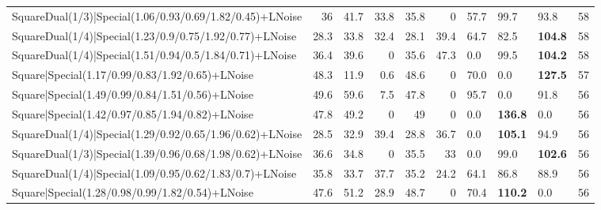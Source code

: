 \begin{tabular}{lrrrrrlllr}
 SquareDual(1/3)|Special(1.06/0.93/0.69/1.82/0.45)+LNoise        &            36   &            41.7 &            33.8 &            35.8 &            0   & 57.7            & 99.7           & 93.8           &           58 \\
 SquareDual(1/4)|Special(1.23/0.9/0.75/1.92/0.77)+LNoise         &            28.3 &            33.8 &            32.4 &            28.1 &           39.4 & 64.7            & 82.5           & \textbf{104.8} &           58 \\
 SquareDual(1/4)|Special(1.51/0.94/0.5/1.84/0.71)+LNoise         &            36.4 &            39.6 &             0   &            35.6 &           47.3 & 0.0             & 99.5           & \textbf{104.2} &           58 \\
 Square|Special(1.17/0.99/0.83/1.92/0.65)+LNoise                 &            48.3 &            11.9 &             0.6 &            48.6 &            0   & 70.0            & 0.0            & \textbf{127.5} &           57 \\
 Square|Special(1.49/0.99/0.84/1.51/0.56)+LNoise                 &            49.6 &            59.6 &             7.5 &            47.8 &            0   & 95.7            & 0.0            & 91.8           &           56 \\
 Square|Special(1.42/0.97/0.85/1.94/0.82)+LNoise                 &            47.8 &            49.2 &             0   &            49   &            0   & 0.0             & \textbf{136.8} & 0.0            &           56 \\
 SquareDual(1/4)|Special(1.29/0.92/0.65/1.96/0.62)+LNoise        &            28.5 &            32.9 &            39.4 &            28.8 &           36.7 & 0.0             & \textbf{105.1} & 94.9           &           56 \\
 SquareDual(1/3)|Special(1.39/0.96/0.68/1.98/0.62)+LNoise        &            36.6 &            34.8 &             0   &            35.5 &           33   & 0.0             & 99.0           & \textbf{102.6} &           56 \\
 SquareDual(1/4)|Special(1.09/0.95/0.62/1.83/0.7)+LNoise         &            35.8 &            33.7 &            37.7 &            35.2 &           24.2 & 64.1            & 86.8           & 88.9           &           56 \\
 Square|Special(1.28/0.98/0.99/1.82/0.54)+LNoise                 &            47.6 &            51.2 &            28.9 &            48.7 &            0   & 70.4            & \textbf{110.2} & 0.0            &           56 \\

\end{tabular}
